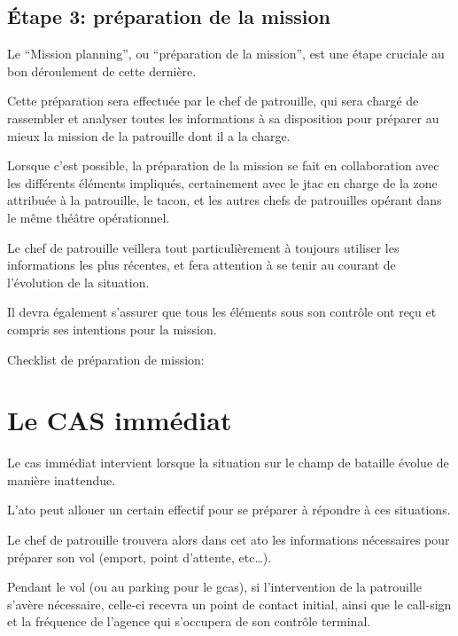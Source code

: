 \subsection{Étape 3: préparation de la mission}

\e
    \item Le ``Mission planning'', ou ``préparation de la mission'', est une étape cruciale au bon déroulement de cette dernière.
    \item Cette préparation sera effectuée par le chef de patrouille, qui sera chargé de rassembler et analyser toutes les informations à sa disposition pour préparer au mieux la mission de la patrouille dont il a la charge.
    \item Lorsque c'est possible, la préparation de la mission se fait en collaboration avec les différents éléments impliqués, certainement avec le \gls{jtac} en charge de la zone attribuée à la patrouille, le \gls{tacon}, et les autres chefs de patrouilles opérant dans le même théâtre opérationnel.
    \item Le chef de patrouille veillera tout particulièrement à toujours utiliser les informations les plus récentes, et fera attention à se tenir au courant de l'évolution de la situation.
    \item Il devra également s'assurer que tous les éléments sous son contrôle ont reçu et compris ses intentions pour la mission.
    \item Checklist de préparation de mission: 
\ed

\section{Le CAS immédiat}

\e
    \item Le \gls{cas} immédiat intervient lorsque la situation sur le champ de bataille évolue de manière inattendue.
    \item L'\gls{ato} peut allouer un certain effectif pour se préparer à répondre à ces situations.
    \item Le chef de patrouille trouvera alors dans cet \gls{ato} les informations nécessaires pour préparer son vol (emport, point d'attente, etc…).
    \item
    Pendant le vol (ou au parking pour le \gls{gcas}), si l'intervention de la patrouille s'avère nécessaire, celle-ci recevra un point de contact initial, ainsi que le call-sign et la fréquence de l'agence qui s'occupera de son contrôle terminal.
\ed





